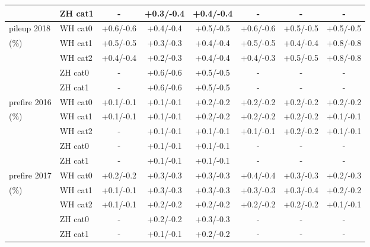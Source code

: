\begin{table}[!htb]
{\begin{tabular}{l|l|c|c|c|c|c|c}
               & ZH cat1   & -           & +0.3/-0.4   & +0.4/-0.4   & -           & -           & -           \\
  \hline
  pileup 2018  & WH cat0   & +0.6/-0.6   & +0.4/-0.4   & +0.5/-0.5   & +0.6/-0.6   & +0.5/-0.5   & +0.5/-0.5   \\
  (\%)         & WH cat1   & +0.5/-0.5   & +0.3/-0.3   & +0.4/-0.4   & +0.5/-0.5   & +0.4/-0.4   & +0.8/-0.8   \\
               & WH cat2   & +0.4/-0.4   & +0.2/-0.3   & +0.4/-0.4   & +0.4/-0.3   & +0.5/-0.5   & +0.8/-0.8   \\
               & ZH cat0   & -           & +0.6/-0.6   & +0.5/-0.5   & -           & -           & -           \\
               & ZH cat1   & -           & +0.6/-0.6   & +0.5/-0.5   & -           & -           & -           \\
  \hline
  prefire 2016 & WH cat0   & +0.1/-0.1   & +0.1/-0.1   & +0.2/-0.2   & +0.2/-0.2   & +0.2/-0.2   & +0.2/-0.2   \\
  (\%)         & WH cat1   & +0.1/-0.1   & +0.1/-0.1   & +0.2/-0.2   & +0.2/-0.2   & +0.2/-0.2   & +0.1/-0.1  \\
               & WH cat2   & -           & +0.1/-0.1   & +0.1/-0.1   & +0.1/-0.1   & +0.2/-0.2   & +0.1/-0.1  \\
               & ZH cat0   & -           & +0.1/-0.1   & +0.1/-0.1   & -           & -           & -           \\
               & ZH cat1   & -           & +0.1/-0.1   & +0.1/-0.1   & -           & -           & -           \\
  \hline
  prefire 2017 & WH cat0   & +0.2/-0.2   & +0.3/-0.3   & +0.3/-0.3   & +0.4/-0.4   & +0.3/-0.3   & +0.2/-0.3   \\
  (\%)         & WH cat1   & +0.1/-0.1   & +0.3/-0.3   & +0.3/-0.3   & +0.3/-0.3   & +0.3/-0.4   & +0.2/-0.2   \\
               & WH cat2   & +0.1/-0.1   & +0.2/-0.2   & +0.2/-0.2   & +0.2/-0.2   & +0.2/-0.2   & +0.1/-0.1  \\
               & ZH cat0   & -           & +0.2/-0.2   & +0.3/-0.3   & -           & -           & -           \\
               & ZH cat1   & -           & +0.1/-0.1   & +0.2/-0.2   & -           & -           & -           \\
  \hline
  \end{tabular}}
  \label{tab:vh_systematics_pu_pf}
\end{table}


